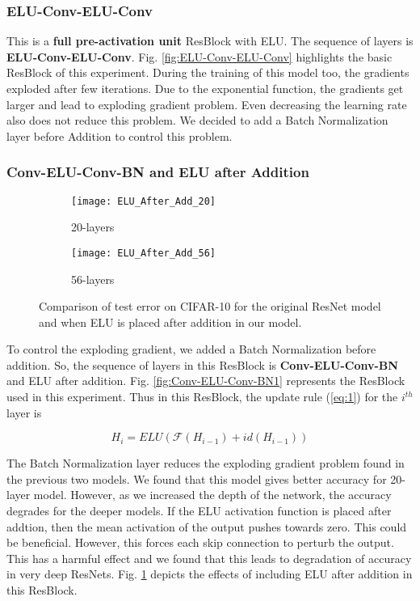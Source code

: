 \documentclass[10pt,twocolumn,letterpaper]{article}
\begin{document}
\subsubsection{ELU-Conv-ELU-Conv}

This is a \textbf{full pre-activation unit} ResBlock \cite{[32]} with ELU. The sequence of layers is \textbf{ELU-Conv-ELU-Conv}. Fig. \ref{fig:ELU-Conv-ELU-Conv} highlights the basic ResBlock of this experiment. During the training of this model too, the gradients exploded after few iterations. Due to the exponential function, the gradients get larger and lead to exploding gradient problem. Even decreasing the learning rate also does not reduce this problem. We decided to add a Batch Normalization layer before Addition to control this problem.

\subsubsection{Conv-ELU-Conv-BN and ELU after Addition}

\begin{figure}
    \centering
    \begin{subfigure}{.23\textwidth}
        \centering
        \texttt{[image: ELU\_After\_Add\_20]}
        \caption{20-layers}
    \end{subfigure}
    \begin{subfigure}{.23\textwidth}
        \centering
        \texttt{[image: ELU\_After\_Add\_56]}
        \caption{56-layers}
    \end{subfigure}
    \caption{Comparison of test error on CIFAR-10 for the original ResNet model and when ELU is placed after addition in our model.}
    \label{fig:ELU_After_Add}
\end{figure}

To control the exploding gradient, we added a Batch Normalization before addition. So, the sequence of layers in this ResBlock is \textbf{Conv-ELU-Conv-BN} and ELU after addition. Fig. \ref{fig:Conv-ELU-Conv-BN1} represents the ResBlock used in this experiment. Thus in this ResBlock, the update rule (\ref{eq:1}) for the \(i^{th}\) layer is 

\begin{equation} \label{eq:elu_after_add}
 H_i = ELU( \mathcal{F}(H_{i-1}) + id(H_{i-1} ))
\end{equation}

The Batch Normalization layer reduces the exploding gradient problem found in the previous two models. We found that this model gives better accuracy for 20-layer model. However, as we increased the depth of the network, the accuracy degrades for the deeper models. If the ELU activation function is placed after addtion, then the mean activation of the output pushes towards zero. This could be beneficial. However, this forces each skip connection to perturb the output. This has a harmful effect and we found that this leads to degradation of accuracy in very deep ResNets. Fig. \ref{fig:ELU_After_Add} depicts the effects of including ELU after addition in this ResBlock.
\end{document}
